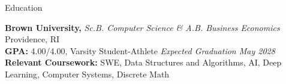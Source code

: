 \documentclass[10pt]{czresume}
\begin{document}
\begin{rSection}{Education}

{\bf Brown University,} {\em Sc.B. Computer Science \& A.B. Business Economics} \hfill {Providence, RI}\\
\textbf{GPA:} 4.00/4.00, Varsity Student-Athlete \hfill {\em Expected Graduation May 2028}\\
\textbf{Relevant Coursework:} SWE, Data Structures and Algorithms, AI, Deep Learning, Computer Systems, Discrete Math

\end{rSection}

\end{document}
